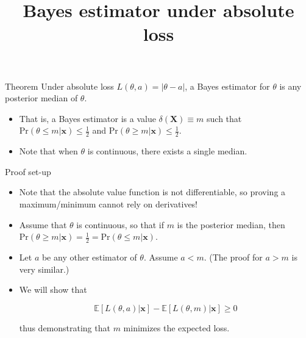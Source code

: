 \documentclass[
  ignorenonframetext,
]{beamer}
\title{Bayes estimator under absolute loss}
\author{}
\date{}
\begin{document}
\frame{\titlepage}
\ifdefined\Shaded\renewenvironment{Shaded}{\begin{tcolorbox}[breakable, frame hidden, borderline west={3pt}{0pt}{shadecolor}, sharp corners, enhanced, interior hidden, boxrule=0pt]}{\end{tcolorbox}}\fi

\begin{frame}{Theorem}
\protect\hypertarget{theorem}{}
Under absolute loss \(L(\theta, a) = |\theta - a|\), a Bayes estimator
for \(\theta\) is any posterior median of \(\theta\).

\begin{itemize}[<+->]
\item
  That is, a Bayes estimator is a value \(\delta(\mathbf{X}) \equiv m\)
  such that \(\text{Pr}(\theta \leq m | \mathbf{x}) \leq \frac{1}{2}\)
  and \(\text{Pr}(\theta \geq m | \mathbf{x}) \leq \frac{1}{2}\).
\item
  Note that when \(\theta\) is continuous, there exists a single median.
\end{itemize}
\end{frame}

\begin{frame}{Proof set-up}
\protect\hypertarget{proof-set-up}{}
\begin{itemize}[<+->]
\item
  Note that the absolute value function is not differentiable, so
  proving a maximum/minimum cannot rely on derivatives!
\item
  Assume that \(\theta\) is continuous, so that if \(m\) is the
  posterior median, then
  \(\text{Pr}(\theta \geq m | \mathbf{x}) = \frac{1}{2} = \text{Pr}(\theta \leq m | \mathbf{x})\).
\item
  Let \(a\) be any other estimator of \(\theta\). Assume \(a < m\). (The
  proof for \(a > m\) is very similar.)
\item
  We will show that

  \[
  \mathbb{E}[L(\theta , a) | \mathbf{x}] - \mathbb{E}[L(\theta, m) | \mathbf{x}]  \geq 0
  \]

  thus demonstrating that \(m\) minimizes the expected loss.
\end{itemize}
\end{frame}
\end{document}
